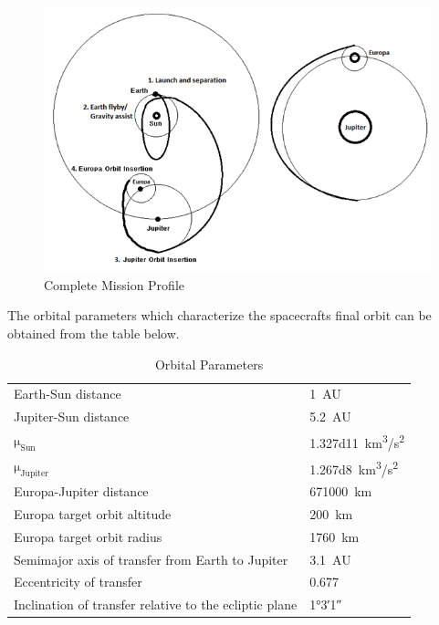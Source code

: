 \begin{figure}[H]
  \includegraphics[width=\textwidth]{Mission-Profile}
  \caption{Complete Mission Profile}
\end{figure}



The orbital parameters which characterize the spacecrafts final orbit
can be obtained from the table below.

\begin{longtable}{ll}
  \caption{Orbital Parameters \cite{nasajupiter}} \\

  Earth-Sun distance & \SI{1}{AU} \\

  Jupiter-Sun distance & \SI{5.2}{AU} \\

  $\mathrm{\mu_{Sun}}$ & \SI{1.327d11}{km^3/s^2} \\

  $\mathrm{\mu_{Jupiter}}$ & \SI{1.267d8}{km^3/s^2} \\

  Europa-Jupiter distance & \SI{671000}{km} \\

  Europa target orbit altitude & \SI{200}{km} \\

  Europa target orbit radius & \SI{1760}{km} \\

  Semimajor axis of transfer from Earth to Jupiter

  & \SI{3.1}{AU} \\

  Eccentricity of transfer & 0.677 \\

  Inclination of transfer relative to the ecliptic plane & \ang{1;3;1}
  \\
\end{longtable}


